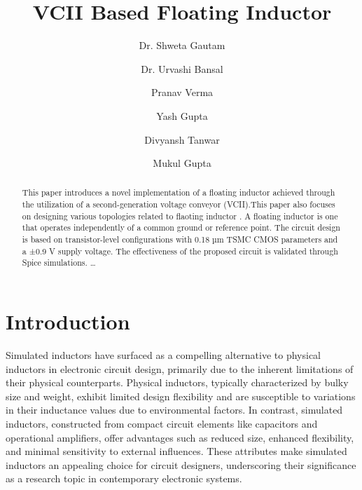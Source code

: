 \documentclass{./styles/svproc}
\begin{document}
\mainmatter              %
%
\title{VCII Based Floating Inductor}
%
%
\author{Dr. Shweta Gautam \and Dr. Urvashi Bansal \and Pranav Verma \and Yash Gupta \and
Divyansh Tanwar\and Mukul Gupta }
%
%
%
\maketitle              %
\begin{abstract}
This paper introduces a novel implementation of a floating inductor achieved through the utilization of a second-generation voltage conveyor (VCII).This paper also focuses on designing various topologies related to flaoting inductor . A floating inductor is one that operates independently of a common ground or reference point. The circuit design is based on transistor-level configurations with 0.18 µm TSMC CMOS parameters and a ±0.9 V supply voltage. The effectiveness of the proposed circuit is validated through Spice simulations. \dots
\end{abstract}
%
\section{Introduction}
%
Simulated inductors have surfaced as a compelling alternative to physical inductors in electronic circuit design, primarily due to the inherent limitations of their physical counterparts. Physical inductors, typically characterized by bulky size and weight, exhibit limited design flexibility and are susceptible to variations in their inductance values due to environmental factors. In contrast, simulated inductors, constructed from compact circuit elements like capacitors and operational amplifiers, offer advantages such as reduced size, enhanced flexibility, and minimal sensitivity to external influences. These attributes make simulated inductors an appealing choice for circuit designers, underscoring their significance as a research topic in contemporary electronic systems.
\end{document}
